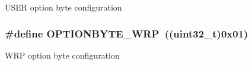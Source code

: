 U\-S\-E\-R option byte configuration \hypertarget{group___f_l_a_s_h_ex___option___type_ga48712a166ea192ddcda0f2653679f9ec}{
\subsubsection[{O\-P\-T\-I\-O\-N\-B\-Y\-T\-E\-\_\-\-W\-R\-P}]{\setlength{\rightskip}{0pt plus 5cm}\#define O\-P\-T\-I\-O\-N\-B\-Y\-T\-E\-\_\-\-W\-R\-P~((uint32\-\_\-t)0x01)}}\label{group___f_l_a_s_h_ex___option___type_ga48712a166ea192ddcda0f2653679f9ec}
W\-R\-P option byte configuration 